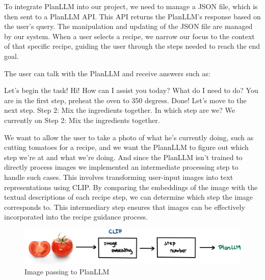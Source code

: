 \documentclass[runningheads]{llncs}
\begin{document}
To integrate PlanLLM into our project, we need to manage a JSON file, which is then sent to a PlanLLM API. This API returns the PlanLLM's response based on the user's query. The manipulation and updating of the JSON file are managed by our system. When a user selects a recipe, we narrow our focus to the context of that specific recipe, guiding the user through the steps needed to reach the end goal.

The user can talk with the PlanLLM and receive answers such as:\\[5pt]

\hspace{0.5cm} %
\begin{minipage}{1.2\textwidth} %
\begin{dialogue}
 Let's begin the task! 
 Hi! How can I assist you today? 
 What do I need to do?
 You are in the first step, preheat the oven to 350 degress.
 Done! Let's move to the next step.
 Step 2: Mix the ingredients together.
 In which step are we?
 We currently on Step 2: Mix the ingredients together.\\[5pt]
\end{dialogue}
\end{minipage}

We want to allow the user to take a photo of what he's currently doing, such as cutting tomatoes for a recipe, and we want the PlannLLM to figure out which step we're at and what we're doing. And since the PlanLLM isn't trained to directly process images we implemented an intermediate processing step to handle such cases. This involves transforming user-input images into text representations using CLIP. By comparing the embeddings of the image with the textual descriptions of each recipe step, we can determine which step the image corresponds to. This intermediary step ensures that images can be effectively incorporated into the recipe guidance process.

\begin{figure}[!htbp]
    \center
    \includegraphics[scale=0.08]{images/planLLM.jpg}
    \caption{Image passing to PlanLLM}
\end{figure}
\end{document}
